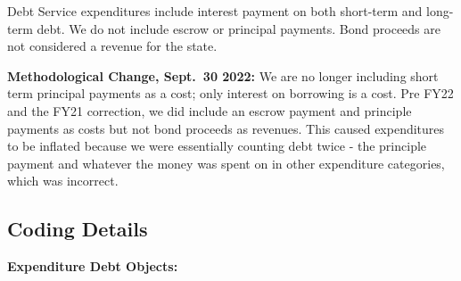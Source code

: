 \documentclass[
  letterpaper,
  DIV=11,
  numbers=noendperiod]{scrreport}
\begin{document}
Debt Service expenditures include interest payment on both short-term
and long-term debt. We do not include escrow or principal payments. Bond
proceeds are not considered a revenue for the state.

\textbf{Methodological Change, Sept.~30 2022:} We are no longer
including short term principal payments as a cost; only interest on
borrowing is a cost. Pre FY22 and the FY21 correction, we did include an
escrow payment and principle payments as costs but not bond proceeds as
revenues. This caused expenditures to be inflated because we were
essentially counting debt twice - the principle payment and whatever the
money was spent on in other expenditure categories, which was incorrect.

\hypertarget{coding-details}{%
\subsection{Coding Details}\label{coding-details}}

\textbf{Expenditure Debt Objects:}
\end{document}
